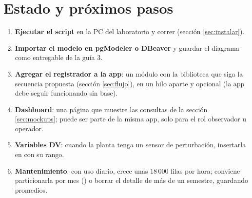 \documentclass[a4paper,11pt]{article}
\begin{document}
\section{Estado y próximos pasos}
\begin{enumerate}
\item \textbf{Ejecutar el script} en la PC del laboratorio y correr  (sección \ref{sec:instalar}).
\item \textbf{Importar el modelo en pgModeler o DBeaver} y guardar el diagrama como entregable de la guía 3.
\item \textbf{Agregar el registrador a la app}: un módulo con la biblioteca  que siga la secuencia propuesta (sección \ref{sec:flujo}), en un hilo aparte y opcional (la app debe seguir funcionando sin base).
\item \textbf{Dashboard}: una página que muestre las consultas de la sección \ref{sec:mockups}; puede ser parte de la misma app, solo para el rol observador u operador.
\item \textbf{Variables DV}: cuando la planta tenga un sensor de perturbación, insertarla en  con su rango.
\item \textbf{Mantenimiento}: con uso diario,  crece unas 18\,000 filas por hora; conviene particionarla por mes () o borrar el detalle de más de un semestre, guardando promedios.
\end{enumerate}
\end{document}
